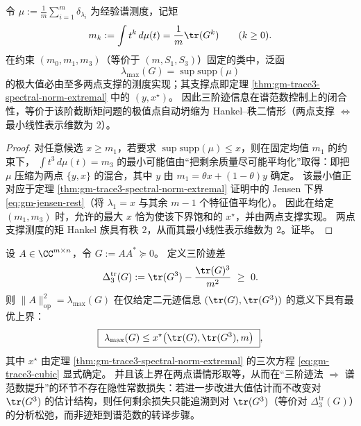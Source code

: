 \begin{proposition}\label{prop:gm-trace3-truncated-moment-rank2}
令 \(\mu:=\frac1m\sum_{i=1}^m\delta_{\lambda_i}\) 为经验谱测度，记矩
\[
m_k:=\int t^k\,d\mu(t)=\frac1m\tr(G^k)\qquad(k\ge 0).
\]
在约束 \((m_0,m_1,m_3)\)（等价于 \((m,S_1,S_3)\)）固定的类中，泛函
\[
\lambda_{\max}(G)=\sup\mathrm{supp}(\mu)
\]
的极大值必由至多两点支撑的测度实现；其支撑点即定理 \ref{thm:gm-trace3-spectral-norm-extremal} 中的 \((y,x^\star)\)。
因此三阶迹信息在谱范数控制上的闭合性，等价于该阶截断矩问题的极值点自动坍缩为 Hankel--秩二情形（两点支撑 \(\Longleftrightarrow\) 最小线性表示维数为 \(2\)）。
\end{proposition}

\begin{proof}
对任意候选 \(x\ge m_1\)，若要求 \(\sup\mathrm{supp}(\mu)\le x\)，则在固定均值 \(m_1\) 的约束下，
\(\int t^3\,d\mu(t)=m_3\) 的最小可能值由“把剩余质量尽可能平均化”取得：即把 \(\mu\) 压缩为两点 \(\{y,x\}\) 的混合，其中 \(y\) 由 \(m_1=\theta x+(1-\theta)y\) 确定。
该最小值正对应于定理 \ref{thm:gm-trace3-spectral-norm-extremal} 证明中的 Jensen 下界 \eqref{eq:gm-jensen-rest}（将 \(\lambda_1=x\) 与其余 \(m-1\) 个特征值平均化）。
因此在给定 \((m_1,m_3)\) 时，允许的最大 \(x\) 恰为使该下界饱和的 \(x^\star\)，并由两点支撑实现。
两点支撑测度的矩 Hankel 族具有秩 \(2\)，从而其最小线性表示维数为 \(2\)。证毕。
\end{proof}

\begin{proposition}\label{prop:gm-trace3-gap-optimal-spectralization}
设 \(A\in\CC^{m\times n}\)，令 \(G:=AA^\ast\succeq 0\)。
定义三阶迹差
\[
\Delta^{\mathrm{tr}}_3(G):=\tr(G^3)-\frac{\tr(G)^3}{m^2}\ \ge\ 0.
\]
则 \(\|A\|_{\mathrm{op}}^2=\lambda_{\max}(G)\) 在仅给定二元迹信息 \((\tr(G),\tr(G^3))\) 的意义下具有最优上界：
\[
\boxed{\ \lambda_{\max}(G)\le x^\star\bigl(\tr(G),\tr(G^3),m\bigr)\ },
\]
其中 \(x^\star\) 由定理 \ref{thm:gm-trace3-spectral-norm-extremal} 的三次方程 \eqref{eq:gm-trace3-cubic} 显式确定。
并且该上界在两点谱情形取等，从而在“三阶迹法 \(\Rightarrow\) 谱范数提升”的环节不存在隐性常数损失：若进一步改进大值估计而不改变对 \(\tr(G^3)\) 的估计结构，则任何剩余损失只能追溯到对 \(\tr(G^3)\)（等价对 \(\Delta^{\mathrm{tr}}_3(G)\)）的分析松弛，而非迹矩到谱范数的转译步骤。
\end{proposition}


